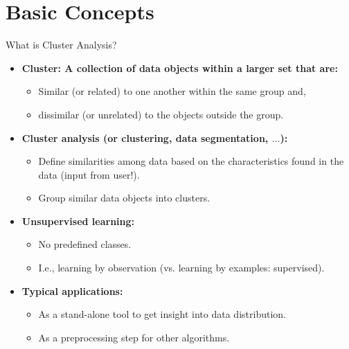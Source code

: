 \section{Basic Concepts}

\begin{frame}{What is Cluster Analysis?}
	\begin{itemize}
		\item \textbf{{\color{airforceblue}Cluster}: A collection of data 
		objects within a larger set that are:}
		\begin{itemize}
			\item {\color{airforceblue}Similar (or related)} to one another 
			within the same group and,
			\item dissimilar (or unrelated) to the objects outside the group.
		\end{itemize}
		\item \textbf{{\color{airforceblue}Cluster analysis} (or clustering, 
		data segmentation, $\ldots$):}
		\begin{itemize}
			\item {\color{airforceblue}Define similarities} among data based on 
			the characteristics found in the data (input from user!).
			\item Group similar data objects into clusters.
		\end{itemize}
		\item \textbf{Unsupervised learning:}
		\begin{itemize}
			\item No predefined classes.
			\item I.e., learning by observation (vs. learning by examples: 
			supervised).
		\end{itemize}
		\item \textbf{Typical applications:}
		\begin{itemize}
			\item As a stand-alone tool to get insight into data distribution.
			\item As a preprocessing step for other algorithms.
		\end{itemize}
	\end{itemize}
\end{frame}

